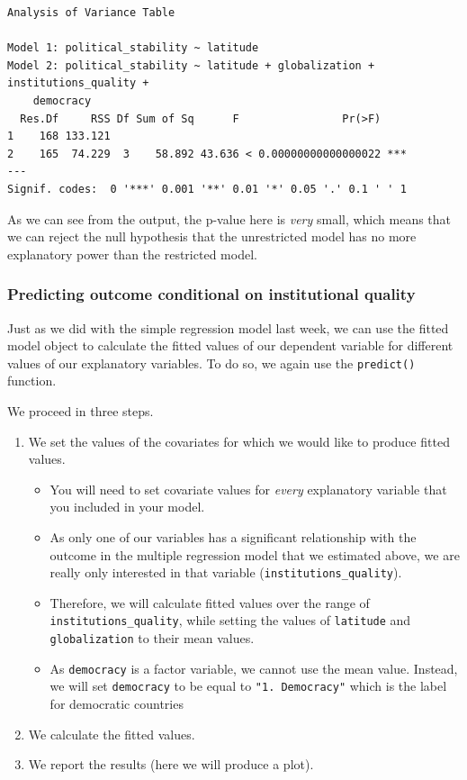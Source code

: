 \documentclass[]{article}
\providecommand{\tightlist}{%
  \setlength{\itemsep}{0pt}\setlength{\parskip}{0pt}}
\theoremstyle{definition}
\theoremstyle{definition}
\theoremstyle{definition}
\theoremstyle{remark}
\begin{document}
\begin{verbatim}
Analysis of Variance Table

Model 1: political_stability ~ latitude
Model 2: political_stability ~ latitude + globalization + institutions_quality + 
    democracy
  Res.Df     RSS Df Sum of Sq      F                Pr(>F)    
1    168 133.121                                              
2    165  74.229  3    58.892 43.636 < 0.00000000000000022 ***
---
Signif. codes:  0 '***' 0.001 '**' 0.01 '*' 0.05 '.' 0.1 ' ' 1
\end{verbatim}

As we can see from the output, the p-value here is \emph{very} small,
which means that we can reject the null hypothesis that the unrestricted
model has no more explanatory power than the restricted model.

\subsubsection{Predicting outcome conditional on institutional
quality}\label{predicting-outcome-conditional-on-institutional-quality}

Just as we did with the simple regression model last week, we can use
the fitted model object to calculate the fitted values of our dependent
variable for different values of our explanatory variables. To do so, we
again use the \texttt{predict()} function.

We proceed in three steps.

\begin{enumerate}
\def\labelenumi{\arabic{enumi}.}
\tightlist
\item
  We set the values of the covariates for which we would like to produce
  fitted values.

  \begin{itemize}
  \tightlist
  \item
    You will need to set covariate values for \emph{every} explanatory
    variable that you included in your model.
  \item
    As only one of our variables has a significant relationship with the
    outcome in the multiple regression model that we estimated above, we
    are really only interested in that variable
    (\texttt{institutions\_quality}).
  \item
    Therefore, we will calculate fitted values over the range of
    \texttt{institutions\_quality}, while setting the values of
    \texttt{latitude} and \texttt{globalization} to their mean values.
  \item
    As \texttt{democracy} is a factor variable, we cannot use the mean
    value. Instead, we will set \texttt{democracy} to be equal to
    \texttt{"1.\ Democracy"} which is the label for democratic countries
  \end{itemize}
\item
  We calculate the fitted values.
\item
  We report the results (here we will produce a plot).
\end{enumerate}
\end{document}
